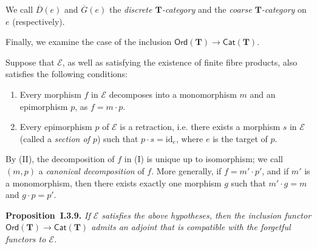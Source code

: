 \documentclass[fleqn]{article}
\newenvironment{itenv}[1]
  {\phantomsection\par\medskip\noindent\textbf{#1.}\itshape}
  {\par\medskip}
\newcommand{\oldpage}[1]{\marginpar{\footnotesize$\Big\vert$ \textit{p.~#1}}}
\newcommand{\id}{\mathrm{id}}
\newcommand{\TT}{\mathbf{T}}
\newcommand{\cat}[1]{\mathcal{#1}}
\newcommand{\Cat}[1]{\mathsf{#1}}
\newcommand{\Ord}[1]{\Cat{Ord}(#1)}
\begin{document}
\oldpage{239}
We call $\overline{D}(e)$ and $\overline{G}(e)$ the \emph{discrete $\TT$-category} and the \emph{coarse $\TT$-category} on $e$ (respectively).

Finally, we examine the case of the inclusion $\Ord{\TT}\to\Cat{Cat}(\TT)$.

Suppose that $\cat{E}$, as well as satisfying the existence of finite fibre products, also satisfies the following conditions:

\begin{enumerate}
  \item[(I)] Every morphism $f$ in $\cat{E}$ decomposes into a monomorphism $m$ and an epimorphism $p$, as $f=m\cdot p$.
  \item[(II)] Every epimorphism $p$ of $\cat{E}$ is a retraction, i.e. there exists a morphism $s$ in $\cat{E}$ (called a \emph{section of $p$}) such that $p\cdot s=\id_e$, where $e$ is the target of $p$.
\end{enumerate}

By (II), the decomposition of $f$ in (I) is unique up to isomorphism;
we call $(m,p)$ a \emph{canonical decomposition} of $f$.
More generally, if $f=m'\cdot p'$, and if $m'$ is a monomorphism, then there exists exactly one morphism $g$ such that $m'\cdot g=m$ and $g\cdot p=p'$.

\begin{itenv}{Proposition~I.3.9}
  If $\cat{E}$ satisfies the above hypotheses, then the inclusion functor $\Ord{\TT}\to\Cat{Cat}(\TT)$ admits an adjoint that is compatible with the forgetful functors to $\cat{E}$.
\end{itenv}
\end{document}
